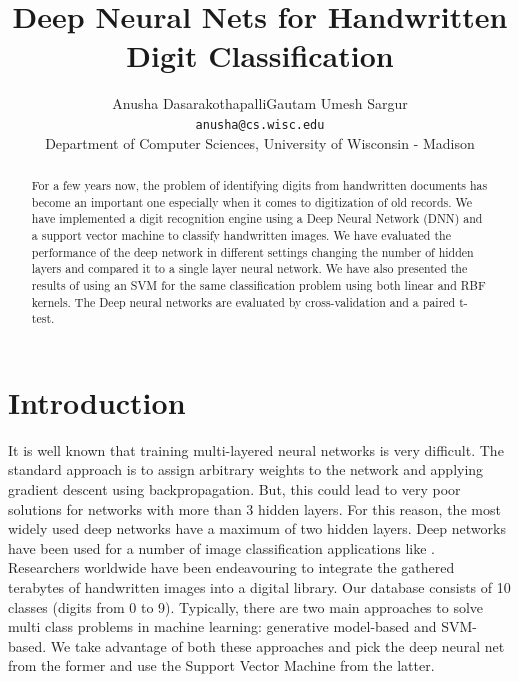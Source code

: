\documentclass[10pt,twocolumn,letterpaper]{article}
\begin{document}
\title{Deep Neural Nets for Handwritten Digit Classification}

\author{Anusha Dasarakothapalli\hspace{14em}Gautam Umesh Sargur\\
{\tt\small anusha@cs.wisc.edu}\hspace{16em}{\tt\small gautam@cs.wisc.edu}\\
Department of Computer Sciences, University of Wisconsin - Madison
}
\maketitle
\thispagestyle{empty}
\begin{abstract}
   For a few years now, the problem of identifying digits from handwritten documents has become an important one especially when it comes to digitization of old records. We have implemented a digit recognition engine using a Deep Neural Network (DNN) and a support vector machine to classify handwritten images. We have evaluated the performance of the deep network in different settings changing the number of hidden layers and compared it to a single layer neural network. We have also presented the results of using an SVM for the same classification problem using both linear and RBF kernels. The Deep neural networks are evaluated by cross-validation and a paired t-test.
\end{abstract}

\section{Introduction}

It is well known that training multi-layered neural networks is very difficult. The standard approach is to assign arbitrary weights to the network and applying gradient descent using backpropagation. But, this could lead to very poor solutions for networks with more than 3 hidden layers. For this reason, the most widely used deep networks have a maximum of two hidden layers. Deep networks have been used for a number of image classification applications like \cite{Schmidhuber:2012:MDN:2354409.2354694}.\\

Researchers worldwide have been endeavouring to integrate the gathered terabytes of handwritten images into a digital library. Our database consists of 10 classes (digits from 0 to 9). Typically, there are two main approaches to solve multi class problems in machine learning: generative model-based and SVM-based. We take advantage of both these approaches and pick the deep neural net from the former and use the Support Vector Machine from the latter.\\
\end{document}
